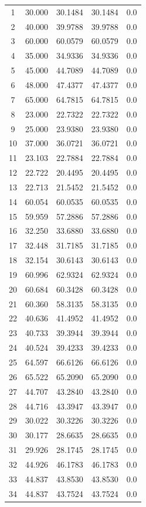\begin{longtable}{
    S[table-format=2.0]
    S[table-format=2.3]
    S[table-format=2.4]
    S[table-format=2.4]
    S[table-format=1.1]
}
 1  & 30.000  & 30.1484  & 30.1484  & 0.0 \\
 2  & 40.000  & 39.9788  & 39.9788  & 0.0 \\
 3  & 60.000  & 60.0579  & 60.0579  & 0.0 \\
 4  & 35.000  & 34.9336  & 34.9336  & 0.0 \\
 5  & 45.000  & 44.7089  & 44.7089  & 0.0 \\
 6  & 48.000  & 47.4377  & 47.4377  & 0.0 \\
 7  & 65.000  & 64.7815  & 64.7815  & 0.0 \\
 8  & 23.000  & 22.7322  & 22.7322  & 0.0 \\
 9  & 25.000  & 23.9380  & 23.9380  & 0.0 \\
10  & 37.000  & 36.0721  & 36.0721  & 0.0 \\
11  & 23.103  & 22.7884  & 22.7884  & 0.0 \\
12  & 22.722  & 20.4495  & 20.4495  & 0.0 \\
13  & 22.713  & 21.5452  & 21.5452  & 0.0 \\
14  & 60.054  & 60.0535  & 60.0535  & 0.0 \\
15  & 59.959  & 57.2886  & 57.2886  & 0.0 \\
16  & 32.250  & 33.6880  & 33.6880  & 0.0 \\
17  & 32.448  & 31.7185  & 31.7185  & 0.0 \\
18  & 32.154  & 30.6143  & 30.6143  & 0.0 \\
19  & 60.996  & 62.9324  & 62.9324  & 0.0 \\
20  & 60.684  & 60.3428  & 60.3428  & 0.0 \\
21  & 60.360  & 58.3135  & 58.3135  & 0.0 \\
22  & 40.636  & 41.4952  & 41.4952  & 0.0 \\
23  & 40.733  & 39.3944  & 39.3944  & 0.0 \\
24  & 40.524  & 39.4233  & 39.4233  & 0.0 \\
25  & 64.597  & 66.6126  & 66.6126  & 0.0 \\
26  & 65.522  & 65.2090  & 65.2090  & 0.0 \\
27  & 44.707  & 43.2840  & 43.2840  & 0.0 \\
28  & 44.716  & 43.3947  & 43.3947  & 0.0 \\
29  & 30.022  & 30.3226  & 30.3226  & 0.0 \\
30  & 30.177  & 28.6635  & 28.6635  & 0.0 \\
31  & 29.926  & 28.1745  & 28.1745  & 0.0 \\
32  & 44.926  & 46.1783  & 46.1783  & 0.0 \\
33  & 44.837  & 43.8530  & 43.8530  & 0.0 \\
34  & 44.837  & 43.7524  & 43.7524  & 0.0 \\
\end{longtable}




